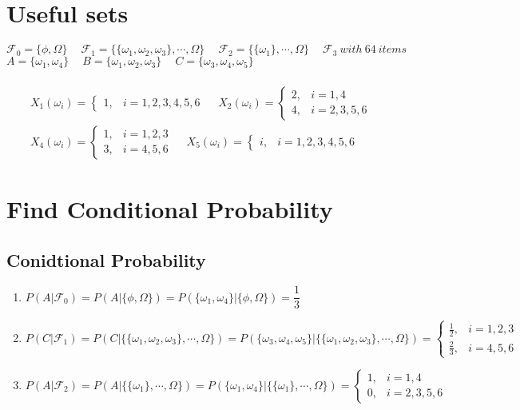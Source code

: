 \documentclass[12pt]{article}
\begin{document}
 

\rhead{\today}
\section*{Useful sets}
$\mathcal{F}_0 = \{\phi,\Omega\} \quad\ \mathcal{F}_1 = \{\{\omega_1, \omega_2, \omega_3\},\cdots, \Omega\}\quad\ \mathcal{F}_2 = \{\{\omega_1\},\cdots, \Omega\}\quad\ \mathcal{F}_3\ with\ 64\ items$\\
$A = \{\omega_1, \omega_4\}\quad\ B = \{\omega_1, \omega_2, \omega_3\}\quad\ C = \{\omega_3, \omega_4, \omega_5\}$\\\\
\begin{align*}
    X_1(\omega_i)=\begin{cases}
        1, & i = 1,2,3,4,5,6
    \end{cases}\quad\ 
    X_2(\omega_i)=\begin{cases}
        2, & i = 1,4\\
        4, & i = 2,3,5,6
    \end{cases}\quad\ \\
    X_4(\omega_i)=\begin{cases}
        1, & i = 1,2,3\\
        3, & i = 4,5,6
    \end{cases}\quad\ 
    X_5(\omega_i)=\begin{cases}
        i, & i = 1,2,3,4,5,6
    \end{cases}
\end{align*}
\section{Find Conditional Probability}
\subsection*{Conidtional Probability}
\begin{enumerate}
    \item $P(A|\mathcal{F}_0)=P(A|\{\phi,\Omega\}) = P(\{\omega_1, \omega_4\}|\{\phi,\Omega\}) = \dfrac{1}{3}$ 
    \item $P(C|\mathcal{F}_1) = P(C|\{\{\omega_1, \omega_2, \omega_3\},\cdots, \Omega\}) = P(\{\omega_3, \omega_4, \omega_5\}|\{\{\omega_1, \omega_2, \omega_3\},\cdots, \Omega\}) = \begin{cases} \frac{1}{2}, & i = 1,2,3\\ \frac{2}{3}, & i = 4,5,6
    \end{cases}$
    \item $P(A|\mathcal{F}_2) = P(A|\{\{\omega_1\},\cdots, \Omega\}) = P(\{\omega_1, \omega_4\}|\{\{\omega_1\},\cdots, \Omega\}) = \begin{cases}
        1, & i = 1,4\\
        0, & i = 2,3,5,6
    \end{cases}$ 
\end{enumerate}
\end{document}
